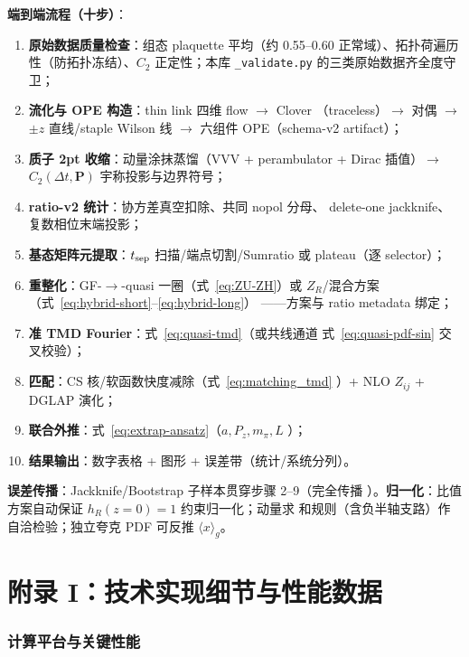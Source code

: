 \documentclass[11pt,a4paper]{ctexart}
\newcommand{\code}[1]{\texttt{#1}}
\begin{document}
\textbf{端到端流程（十步）}：
\begin{enumerate}
  \item \textbf{原始数据质量检查}：组态 plaquette 平均（约 0.55--0.60
  正常域）、拓扑荷遍历性（防拓扑冻结）、$C_2$ 正定性；本库
  \code{\_validate.py} 的三类原始数据齐全度守卫；
  \item \textbf{流化与 OPE 构造}：thin link 四维 flow $\to$ Clover
  （traceless）$\to$ 对偶 $\to$ $\pm z$ 直线/staple Wilson 线 $\to$
  六组件 OPE（schema-v2 artifact）；
  \item \textbf{质子 2pt 收缩}：动量涂抹蒸馏（VVV + perambulator +
  Dirac 插值）$\to$ $C_2(\Delta t,\mathbf P)$ 宇称投影与边界符号；
  \item \textbf{ratio-v2 统计}：协方差真空扣除、共同 nopol 分母、
  delete-one jackknife、复数相位末端投影；
  \item \textbf{基态矩阵元提取}：$t_{\rm sep}$ 扫描/端点切割/Sumratio
  或 plateau（逐 selector）；
  \item \textbf{重整化}：GF-$\to$-quasi 一圈（式~\eqref{eq:ZU-ZH}）或
  $Z_R$/混合方案（式~\eqref{eq:hybrid-short}--\eqref{eq:hybrid-long}）
  ——方案与 ratio metadata 绑定；
  \item \textbf{准 TMD Fourier}：式~\eqref{eq:quasi-tmd}（或共线通道
  式~\eqref{eq:quasi-pdf-sin} 交叉校验）；
  \item \textbf{匹配}：CS 核/软函数快度减除（式~\eqref{eq:matching_tmd}
  ）+ NLO $Z_{ij}$ + DGLAP 演化；
  \item \textbf{联合外推}：式~\eqref{eq:extrap-ansatz}（$a,P_z,m_\pi,L$
  ）；
  \item \textbf{结果输出}：数字表格 + 图形 + 误差带（统计/系统分列）。
\end{enumerate}
\textbf{误差传播}：Jackknife/Bootstrap 子样本贯穿步骤 2--9（完全传播
）。\textbf{归一化}：比值方案自动保证 $h_R(z=0)=1$ 约束归一化；动量求
和规则（含负半轴支路）作自洽检验；独立夸克 PDF 可反推 $\langle x\rangle_g
$。

\section{附录 I：技术实现细节与性能数据}

\subsubsection{计算平台与关键性能}
\end{document}
